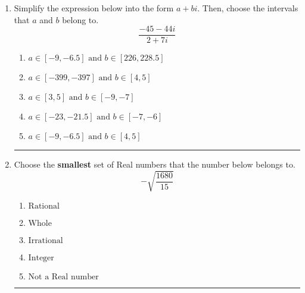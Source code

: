 \documentclass[14pt]{extbook}
\newcommand{\litem}[1]{\item#1\hspace*{-1cm}\rule{\textwidth}{0.4pt}}
\begin{document}
\begin{enumerate}
{\begin{enumerate}[label=\Alph*.]
\end{enumerate} }
\litem{
Simplify the expression below into the form $a+bi$. Then, choose the intervals that $a$ and $b$ belong to.\[ \frac{-45 - 44 i}{2 + 7 i} \]\begin{enumerate}[label=\Alph*.]
\item \( a \in [-9, -6.5] \text{ and } b \in [226, 228.5] \)
\item \( a \in [-399, -397] \text{ and } b \in [4, 5] \)
\item \( a \in [3, 5] \text{ and } b \in [-9, -7] \)
\item \( a \in [-23, -21.5] \text{ and } b \in [-7, -6] \)
\item \( a \in [-9, -6.5] \text{ and } b \in [4, 5] \)

\end{enumerate} }
\litem{
Choose the \textbf{smallest} set of Real numbers that the number below belongs to.\[ -\sqrt{\frac{1680}{15}} \]\begin{enumerate}[label=\Alph*.]
\item \( \text{Rational} \)
\item \( \text{Whole} \)
\item \( \text{Irrational} \)
\item \( \text{Integer} \)
\item \( \text{Not a Real number} \)

\end{enumerate} }
\end{enumerate}
\end{document}
